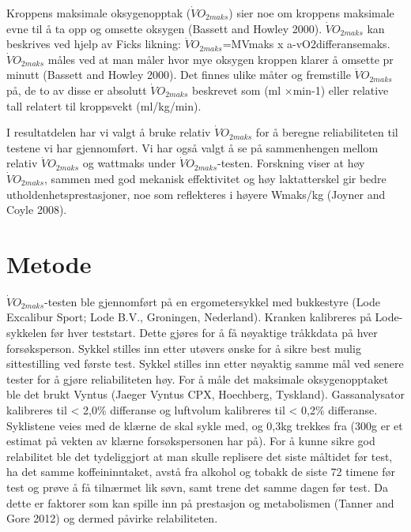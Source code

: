 \documentclass[
  letterpaper,
  DIV=11,
  numbers=noendperiod]{scrreprt}
\begin{document}
Kroppens maksimale oksygenopptak (\(\dot{V}O_{2maks}\)) sier noe om
kroppens maksimale evne til å ta opp og omsette oksygen (Bassett and
Howley 2000). \(\dot{V}O_{2maks}\) kan beskrives ved hjelp av Ficks
likning: \(\dot{V}O_{2maks}\)=MVmaks x a-vO2differansemaks.
\(\dot{V}O_{2maks}\) måles ved at man måler hvor mye oksygen kroppen
klarer å omsette pr minutt (Bassett and Howley 2000). Det finnes ulike
måter og fremstille \(\dot{V}O_{2maks}\) på, de to av disse er absolutt
\(\dot{V}O_{2maks}\) beskrevet som (ml ×min-1) eller relative tall
relatert til kroppsvekt (ml/kg/min).

I resultatdelen har vi valgt å bruke relativ \(\dot{V}O_{2maks}\) for å
beregne reliabiliteten til testene vi har gjennomført. Vi har også valgt
å se på sammenhengen mellom relativ \(\dot{V}O_{2maks}\) og wattmaks
under \(\dot{V}O_{2maks}\)-testen. Forskning viser at høy
\(\dot{V}O_{2maks}\), sammen med god mekanisk effektivitet og høy
laktatterskel gir bedre utholdenhetsprestasjoner, noe som reflekteres i
høyere Wmaks/kg (Joyner and Coyle 2008).

\section{Metode}\label{metode}

\(\dot{V}O_{2maks}\)-testen ble gjennomført på en ergometersykkel med
bukkestyre (Lode Excalibur Sport; Lode B.V., Groningen, Nederland).
Kranken kalibreres på Lode-sykkelen før hver teststart. Dette gjøres for
å få nøyaktige tråkkdata på hver forsøksperson. Sykkel stilles inn etter
utøvers ønske for å sikre best mulig sittestilling ved første test.
Sykkel stilles inn etter nøyaktig samme mål ved senere tester for å
gjøre reliabiliteten høy. For å måle det maksimale oksygenopptaket ble
det brukt Vyntus (Jaeger Vyntus CPX, Hoechberg, Tyskland).
Gassanalysator kalibreres til \textless{} 2,0\% differanse og luftvolum
kalibreres til \textless{} 0,2\% differanse. Syklistene veies med de
klærne de skal sykle med, og 0,3kg trekkes fra (300g er et estimat på
vekten av klærne forsøkspersonen har på). For å kunne sikre god
relabilitet ble det tydeliggjort at man skulle replisere det siste
måltidet før test, ha det samme koffeininntaket, avstå fra alkohol og
tobakk de siste 72 timene før test og prøve å få tilnærmet lik søvn,
samt trene det samme dagen før test. Da dette er faktorer som kan spille
inn på prestasjon og metabolismen (Tanner and Gore 2012) og dermed
påvirke relabiliteten.
\end{document}
